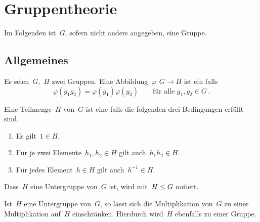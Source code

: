 \chapter{Gruppentheorie}

\begin{convention}
  Im Folgenden ist~$G$, sofern nicht anders angegeben, eine Gruppe.
\end{convention}

\section{Allgemeines}

\begin{definition}
  Es seien~$G$,~$H$ zwei Gruppen.
  Eine Abbildung~$\varphi \colon G \to H$ ist ein  falls
  \[
    \varphi(g_1 g_2) = \varphi(g_1) \varphi(g_2)
    \qquad
    \text{für alle~$g_1, g_2 \in G$} \,.
  \]
\end{definition}

\begin{definition}
  Eine Teilmenge~$H$ von~$G$ ist eine  falls die folgenden drei Bedingungen erfüllt sind.
  \begin{enumerate}
    \item
      Es gilt~$1 \in H$.
    \item
      Für je zwei Elemente~$h_1, h_2 \in H$ gilt auch~$h_1 h_2 \in H$.
    \item
      Für jedes Element~$h \in H$ gilt auch~$h^{-1} \in H$.
  \end{enumerate}
  Dass~$H$ eine Untergruppe von~$G$ ist, wird mit~$H \leq G$ notiert.
\end{definition}

Ist~$H$ eine Untergruppe von~$G$, so lässt sich die Multiplikation von~$G$ zu einer Multiplikation auf~$H$ einschränken.
Hierdurch wird~$H$ ebenfalls zu einer Gruppe.

